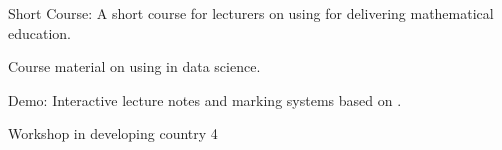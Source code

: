\begin{workpackage}
\begin{wpdelivs}
 \begin{wpdeliv}[due=18,id=short-course,dissem=PU,nature=DEC,lead=USH]{Short Course: A short course for lecturers on using \TheProject for delivering mathematical education.}\end{wpdeliv}
 \begin{wpdeliv}[due=24,id=datascience-course,dissem=PU,nature=DEC,lead=USH]{Course material on using \TheProject in data science.}
   \end{wpdeliv}
 \begin{wpdeliv}[due=36,id=lecture-notes,dissem=PU,nature=DEM,lead=USH]{Demo: Interactive lecture notes and marking systems based on \TheProject.}\end{wpdeliv}
 \begin{wpdeliv}[due=48,id=developing-countries4,dissem=PU,nature=DEM,lead=UB]{Workshop in developing country 4} \end{wpdeliv}


\end{wpdelivs}


\end{workpackage}


